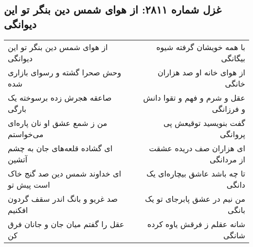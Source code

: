 \begin{center}
\section*{غزل شماره ۲۸۱۱: از هوای شمس دین بنگر تو این دیوانگی}
\label{sec:2811}
\begin{longtable}{l p{0.5cm} r}
از هوای شمس دین بنگر تو این دیوانگی
&&
با همه خویشان گرفته شیوه بیگانگی
\\
وحش صحرا گشته و رسوای بازاری شده
&&
از هوای خانه او صد هزاران خانگی
\\
صاعقه هجرش زده برسوخته یک بارگی
&&
عقل و شرم و فهم و تقوا دانش و فرزانگی
\\
من ز شمع عشق او نان پاره‌ای می‌خواستم
&&
گفت بنویسید توقیعش پی پروانگی
\\
ای گشاده قلعه‌های جان به چشم آتشین
&&
ای هزاران صف دریده عشقت از مردانگی
\\
ای خداوند شمس دین صد گنج خاک است پیش تو
&&
تا چه باشد عاشق بیچاره‌ای یک دانگی
\\
صد غریو و بانگ اندر سقف گردون افکنیم
&&
من نیم در عشق پابرجای تو یک بانگی
\\
عقل را گفتم میان جان و جانان فرق کن
&&
شانه عقلم ز فرقش یاوه کرده شانگی
\\
\end{longtable}
\end{center}
